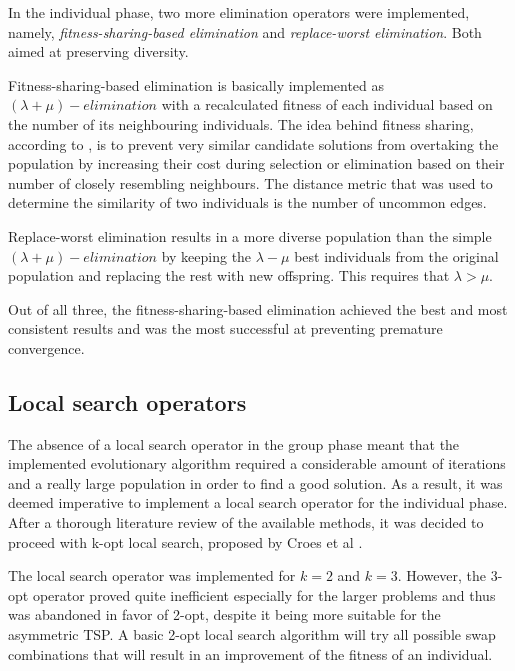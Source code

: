 \documentclass[a4paper,10pt]{article}
\newcommand{\ReplaceMe}[1]{{\color{blue}#1}}
\begin{document}
In the individual phase, two more elimination operators were implemented, namely, \textit{fitness-sharing-based elimination} and \textit{replace-worst elimination}. Both aimed at preserving diversity.

Fitness-sharing-based elimination is basically implemented as $(\lambda+\mu)-elimination$ with a recalculated fitness of each individual based on the number of its neighbouring individuals. The idea behind fitness sharing, according to \cite{eiben}, is to prevent very similar candidate solutions from overtaking the population by increasing their cost during selection or elimination based on their number of closely resembling neighbours. The distance metric that was used to determine the similarity of two individuals is the number of uncommon edges.

Replace-worst elimination results in a more diverse population than the simple $(\lambda+\mu)-elimination$ by keeping the $\lambda-\mu$ best individuals from the original population and replacing the rest with new offspring. This requires that $\lambda > \mu$.

Out of all three, the fitness-sharing-based elimination achieved the best and most consistent results and was the most successful at preventing premature convergence.

\subsection{Local search operators} \label{ss:local_search}

The absence of a local search operator in the group phase meant that the implemented evolutionary algorithm required a considerable amount of iterations and a really large population in order to find a good solution. As a result, it was deemed imperative to implement a local search operator for the individual phase. After a thorough literature review of the available methods, it was decided to proceed with k-opt local search, proposed by Croes et al \cite{k-opt}.

The local search operator was implemented for $k=2$ and $k=3$. However, the 3-opt operator proved quite inefficient especially for the larger problems and thus was abandoned in favor of 2-opt, despite it being more suitable for the asymmetric TSP. A basic 2-opt local search algorithm will try all possible swap combinations that will result in an improvement of the fitness of an individual.
\end{document}
